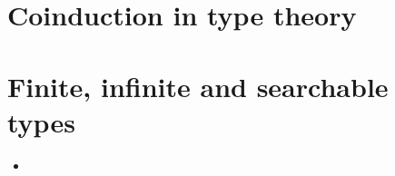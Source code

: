 \documentclass{beamer}
\begin{document}

\section{Coinduction in type theory}



\section{Finite, infinite and searchable types}

\begin{frame}{}
\begin{itemize}
	\item 
\end{itemize}
\end{frame}
\end{document}
